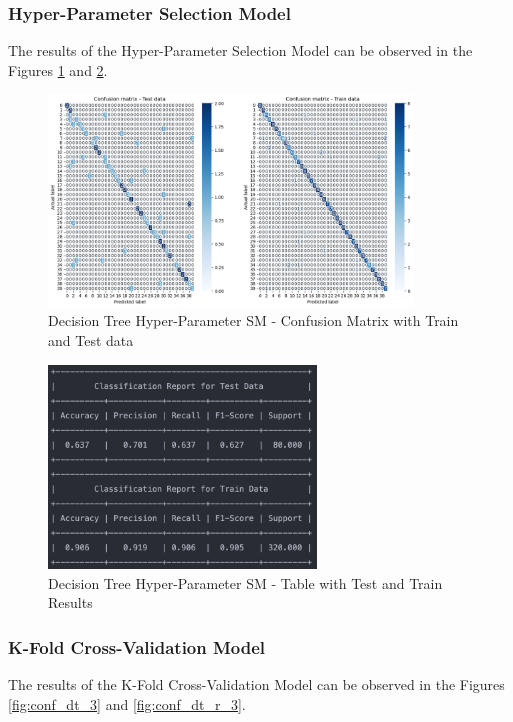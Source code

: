 \documentclass[conference]{IEEEtran}
\begin{document}
\subsubsection{Hyper-Parameter Selection Model}
The results of the Hyper-Parameter Selection Model can be observed in the Figures \ref{fig:conf_dt_2} and \ref{fig:conf_dt_r_2}.

\begin{figure}[H]
    \centering
    \includegraphics[width=3.8in]{DT/2.png}%
    \caption{Decision Tree Hyper-Parameter SM - Confusion Matrix with Train and Test data}%
    \label{fig:conf_dt_2}%
\end{figure}

\begin{figure}[H]
    \centering
    \includegraphics[width=2.8in]{DT/Screenshot 2023-01-21 at 01.15.37.png}%
    \caption{Decision Tree Hyper-Parameter SM - Table with Test and Train Results}%
    \label{fig:conf_dt_r_2}%
\end{figure}

\subsubsection{K-Fold Cross-Validation Model}
The results of the K-Fold Cross-Validation Model can be observed in the Figures \ref{fig:conf_dt_3} and \ref{fig:conf_dt_r_3}.
\end{document}
